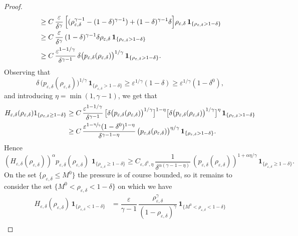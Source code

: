 \documentclass[10pt]{amsart}
\newcommand{\<}{\bigl\langle}
\renewcommand{\>}{\bigr\rangle}
\theoremstyle{definition}
\theoremstyle{remark}
\let\ep\varepsilon
\begin{document}
\begin{proof}
\begin{align*}
& \geq C \,\dfrac{\ep}{\delta^\gamma}\, \Bigl[
(\rho_{\varepsilon,\delta}^{\gamma-1} - (1-\delta)^{\gamma-1})
+ (1-\delta)^{\gamma-1}\delta \Bigr] \rho_{\ep,\delta}
\,\mathbf{1}_{\{ \rho_{\ep,\delta} > 1-\delta \}}\\
& \geq C \,\dfrac{\ep}{\delta^\gamma}\, (1-\delta)^{\gamma-1}\delta \rho_{\ep,\delta}
\,\mathbf{1}_{\{ \rho_{\ep,\delta} > 1-\delta \}}\\
& \geq C\,\frac{\varepsilon^{1-1/\gamma}}{\delta^{\gamma-1}}\,\delta \big(p_{\varepsilon,\delta}(\rho_{\varepsilon,\delta})\big)^{1/\gamma}\,\mathbf{1}_{\{ \rho_{\ep,\delta} > 1-\delta \}}.
\end{align*}
Observing that
\[
\delta \, \big(p_{\varepsilon,\delta}(\rho_{\varepsilon,\delta})\big)^{1/\gamma}\,\mathbf{1}_{\{ \rho_{\ep,\delta} > 1-\delta \}}
\ge \varepsilon^{1/\gamma}(1-\delta)
\ge \varepsilon^{1/\gamma}(1-\delta^0),
\]
and introducing $\eta = \min(1,\gamma-1)$, we get that
\begin{align*}
H_{\varepsilon,\delta}(\rho_{\varepsilon,\delta}) 1_{\{\rho_{\varepsilon,\delta} \geq 1-\delta\}}
& \geq C \,\frac{\varepsilon^{1-1/\gamma}}{\delta^{\gamma-1}}\,
\big[\delta \big(p_{\varepsilon,\delta}(\rho_{\varepsilon,\delta})\big)^{1/\gamma}\big]^{1-\eta}
\big[\delta \big(p_{\varepsilon,\delta}(\rho_{\varepsilon,\delta})\big)^{1/\gamma}\big]^{\eta}
\,\mathbf{1}_{\{ \rho_{\ep,\delta} > 1-\delta \}} \\
& \geq C\, \frac{\varepsilon^{1-\sfrac{\eta}{\gamma}}(1-\delta^0)^{1-\eta}}{\delta^{\gamma-1-\eta}}\, \big(p_{\varepsilon,\delta}(\rho_{\varepsilon,\delta})\big)^{\eta/\gamma}
\,\mathbf{1}_{\{ \rho_{\ep,\delta} > 1-\delta \}}.
\end{align*}
Hence
\[
(H_{\varepsilon,\delta}(\rho_{\varepsilon, \delta}))^{\alpha}
p_{\varepsilon,\delta}(\rho_{\varepsilon,\delta})\,
\,\mathbf{1}_{\{\rho_{\varepsilon,\delta} \ge 1-\delta\} }
\ge C_{\varepsilon,\delta^0,\eta}\, \frac{1}{\delta^{\alpha(\gamma-1-\eta)}}\,
(p_{\varepsilon,\delta}(\rho_{\varepsilon,\delta}))^{1+\alpha\eta/\gamma}
\,\mathbf{1}_{\{\rho_{\varepsilon,\delta} \ge 1-\delta\} }.
\]
On the set $\{\rho_{\ep,\delta} \leq M^0\}$ the pressure is of course bounded, so it remains to consider the set $\{M^0 < \rho_{\varepsilon,\delta} < 1-\delta\}$ on which we have
\begin{align*}
H_{\varepsilon,\delta}(\rho_{\varepsilon, \delta})\,\mathbf{1}_{\{\rho_{\varepsilon,\delta} < 1-\delta\}}
& = \dfrac{\ep}{\gamma-1}\, \dfrac{\rho_{\ep,\delta}^\gamma}{(1-\rho_{\ep,\delta})^{\gamma}}\,\mathbf{1}_{\{M^0 < \rho_{\varepsilon,\delta} < 1-\delta\}} \\

\end{align*}
\end{proof}
\end{document}
